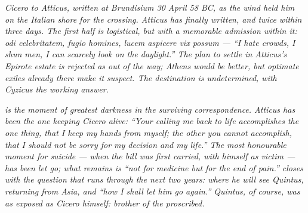 
\textit{Cicero to Atticus, written at Brundisium 30 April 58
BC, as the wind held him on the Italian shore for the
crossing. Atticus has finally written, and twice within three
days. The first half is logistical, but with a memorable
admission within it: \textit{odi celebritatem, fugio homines,
lucem aspicere vix possum} --- ``I hate crowds, I shun men, I
can scarcely look on the daylight.'' The plan to settle in
Atticus's Epirote estate is rejected as out of the way; Athens
would be better, but optimate exiles already there make it
suspect. The destination is undetermined, with Cyzicus the
working answer.}

\textit{ is the moment of greatest darkness in
the surviving correspondence. Atticus has been the one
keeping Cicero alive: ``Your calling me back to life
accomplishes the one thing, that I keep my hands from myself;
the other you cannot accomplish, that I should not be sorry
for my decision and my life.'' The most honourable moment
for suicide --- when the bill was first carried, with himself
as victim --- has been let go; what remains is ``not for
medicine but for the end of pain.''  closes
with the question that runs through the next two years: where
he will see Quintus, returning from Asia, and ``how I shall
let him go again.'' Quintus, of course, was as exposed as
Cicero himself: brother of the proscribed.}
